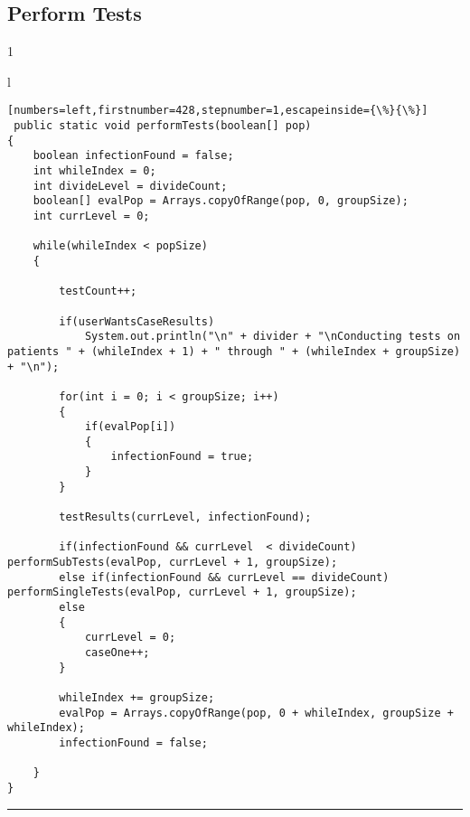 \documentclass[letterpaper, 10pt,DIV=13]{scrartcl}
\numberwithin{equation}{section} %
\numberwithin{figure}{section} %
\numberwithin{table}{section} %
\begin{document}
\subsection{Perform Tests}

1
\begin{center}
\begin{tabular}{l}
\begin{lstlisting}[numbers=left,firstnumber=428,stepnumber=1,escapeinside={\%}{\%}]
 public static void performTests(boolean[] pop)
{
    boolean infectionFound = false;
    int whileIndex = 0;                  
    int divideLevel = divideCount;  
    boolean[] evalPop = Arrays.copyOfRange(pop, 0, groupSize);   
    int currLevel = 0;

    while(whileIndex < popSize) 
    {

        testCount++;

        if(userWantsCaseResults)
            System.out.println("\n" + divider + "\nConducting tests on patients " + (whileIndex + 1) + " through " + (whileIndex + groupSize) + "\n");

        for(int i = 0; i < groupSize; i++)
        {
            if(evalPop[i])
            {
                infectionFound = true;
            }
        }

        testResults(currLevel, infectionFound);

        if(infectionFound && currLevel  < divideCount)                    performSubTests(evalPop, currLevel + 1, groupSize);
        else if(infectionFound && currLevel == divideCount)                performSingleTests(evalPop, currLevel + 1, groupSize);
        else
        {
            currLevel = 0;
            caseOne++;
        }

        whileIndex += groupSize;
        evalPop = Arrays.copyOfRange(pop, 0 + whileIndex, groupSize + whileIndex);
        infectionFound = false;  

    }
}
\end{lstlisting}
\end{tabular}
\end{center}\textbf{}

\par\noindent\rule{\textwidth}{0.4pt}
\end{document}
